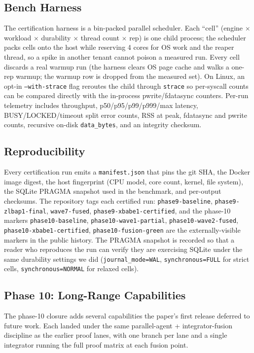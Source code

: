\subsection{Bench Harness}
The certification harness is a bin-packed parallel scheduler. Each
``cell'' (engine $\times$ workload $\times$ durability $\times$ thread
count $\times$ rep) is one child process; the scheduler packs cells
onto the host while reserving 4 cores for OS work and the reaper
thread, so a spike in another tenant cannot poison a measured run.
Every cell discards a real warmup run (the harness clears OS page
cache and walks a one-rep warmup; the warmup row is dropped from the
measured set). On Linux, an opt-in \texttt{--with-strace} flag
reroutes the child through \texttt{strace} so per-syscall counts can
be compared directly with the in-process pwrite/fdatasync counters.
Per-run telemetry includes throughput, p50/p95/p99/p999/max latency,
BUSY/LOCKED/timeout split error counts, RSS at peak,
fdatasync and pwrite counts, recursive on-disk \texttt{data\_bytes},
and an integrity checksum.

\subsection{Reproducibility}
Every certification run emits a \texttt{manifest.json} that pins the
git SHA, the Docker image digest, the host fingerprint (CPU model,
core count, kernel, file system), the SQLite PRAGMA snapshot used in
the benchmark, and per-output checksums. The repository tags each
certified run: \texttt{phase9-baseline}, \texttt{phase9-zlbap1-final},
\texttt{wave7-fused}, \texttt{phase9-xbabe1-certified}, and the
phase-10 markers \texttt{phase10-baseline},
\texttt{phase10-wave1-partial}, \texttt{phase10-wave2-fused},
\texttt{phase10-xbabe1-certified}, \texttt{phase10-fusion-green} are
the externally-visible markers in the public history. The PRAGMA
snapshot is recorded so that a reader who reproduces the run can
verify they are exercising SQLite under the same durability settings
we did (\texttt{journal\_mode=WAL}, \texttt{synchronous=FULL} for
strict cells, \texttt{synchronous=NORMAL} for relaxed cells).

\subsection{Phase 10: Long-Range Capabilities}
The phase-10 closure adds several capabilities the paper's first
release deferred to future work. Each landed under the same
parallel-agent + integrator-fusion discipline as the earlier
proof lanes, with one branch per lane and a single integrator running
the full proof matrix at each fusion point.

